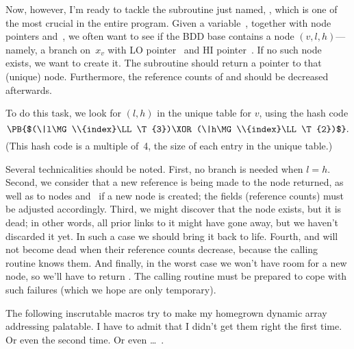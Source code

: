 Now, however, I'm ready to tackle the subroutine just named, ,
which is one of the most crucial in the entire program.
Given a variable~, together with node pointers  and~,
we often
want to see if the BDD base contains a node $(v,l,h)$---namely, a branch
on~$x_v$ with {\mc LO} pointer~ and {\mc HI} pointer~.
If no such node exists, we want to create it. The subroutine should return a
pointer to that (unique) node. Furthermore,
the reference counts of  and  should be decreased afterwards.

To do this task, we look for $(l,h)$ in the unique table for $v$,
using the hash code
$$\hbox{\PB{$(\|l\MG\\{index}\LL\T{3})\XOR(\|h\MG\\{index}\LL\T{2})$}}.$$
(This hash code is a multiple of~4,
the size of each entry in the unique table.)

Several technicalities should be noted. First, no branch is needed
when $l=h$. Second, we consider that a
new reference is being made to the node returned, as well as to nodes
 and~ if a new node is created;
the  fields (reference counts) must be adjusted accordingly.
Third, we might discover that the node exists, but it is dead;
in other words, all prior links to it might have gone away, but we haven't
discarded it yet. In such a case we should bring it back to life.
Fourth,  and  will not become dead
when their reference counts decrease, because the calling routine knows them.
And finally, in the worst case we won't have room for a new node, so we'll
have to return \PB{$\NULL$}. The calling routine must be prepared to cope with
such failures (which we hope are only temporary).

The following inscrutable macros try to make my homegrown dynamic array
addressing palatable. I have to admit that I didn't get them right
the first time. Or even the second time. Or even \dots~.

